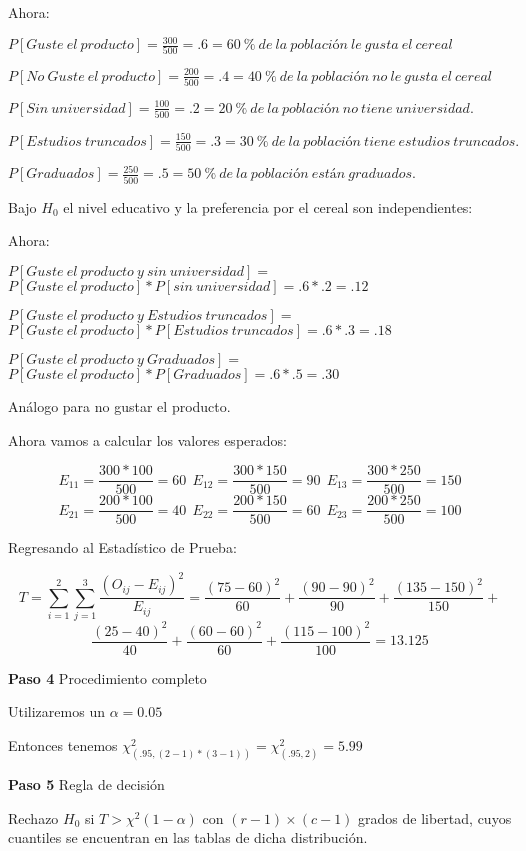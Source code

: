 \documentclass[
  a4paper,
  oneside,
  openany]{book}
\begin{document}
Ahora:

\(P[Guste\ el\ producto]= \frac{300}{500}=.6= 60\ \%\ de\ la\ población\ le\ gusta\ el\ cereal\)

\(P[No\ Guste\ el\ producto]= \frac{200}{500}=.4= 40\ \%\ de\ la\ población\ no\ le\ gusta\ el\ cereal\)

\(P[Sin\ universidad]= \frac{100}{500}=.2= 20\ \%\ de\ la\ población\ no\ tiene\ universidad.\)

\(P[Estudios\ truncados]= \frac{150}{500}=.3= 30\ \%\ de\ la\ población\ tiene\ estudios\ truncados.\)

\(P[Graduados]= \frac{250}{500}=.5= 50\ \%\ de\ la\ población\ están\ graduados.\)

Bajo \(H_0\) el nivel educativo y la preferencia por el cereal son independientes:

Ahora:

\(P[Guste\ el\ producto\ y\ sin\ universidad]=\)
\(P[Guste\ el\ producto]*P[sin\ universidad]=.6*.2=.12\)

\(P[Guste\ el\ producto\ y\ Estudios\ truncados]=\)
\(P[Guste\ el\ producto]*P[Estudios\ truncados]=.6*.3=.18\)

\(P[Guste\ el\ producto\ y\ Graduados]=\)
\(P[Guste\ el\ producto]*P[Graduados]=.6*.5=.30\)

Análogo para no gustar el producto.

Ahora vamos a calcular los valores esperados:

\[E_{11}=\frac{300*100}{500}=60 \ \ E_{12}=\frac{300*150}{500}=90 \ \  E_{13}=\frac{300*250}{500}=150\]
\[E_{21}=\frac{200*100}{500}=40 \ \  E_{22}=\frac{200*150}{500}=60 \ \ E_{23}=\frac{200*250}{500}=100\]

Regresando al Estadístico de Prueba:

\[T=\sum_{i=1}^{2}\sum_{j=1}^{3}\frac{(O_{ij}-E_{ij})^2}{E_{ij}}= \frac{(75-60)^2}{60}+\frac{(90-90)^2}{90}+\frac{(135-150)^2}{150}+\]
\[\frac{(25-40)^2}{40}+\frac{(60-60)^2}{60}+\frac{(115-100)^2}{100}=13.125\]

\textbf{Paso 4} Procedimiento completo

Utilizaremos un \(\alpha=0.05\)

Entonces tenemos \(\chi^2_{(.95,(2-1)*(3-1))}=\chi^2_{(.95,2)}=5.99\)

\textbf{Paso 5} Regla de decisión

Rechazo \(H_0\) si \(T> \chi^2(1-\alpha)\) con \((r-1)\times(c-1)\) grados de libertad, cuyos cuantiles se encuentran en las tablas de dicha distribución.
\end{document}
